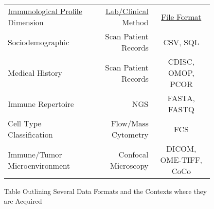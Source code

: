 
\begin{figure*}
\caption{Table Outlining Several Data Formats and the Contexts where they are Acquired}
{\large
\vspace{1.5em}
\begin{tabular}{ l | r | c }
\underline{Immunological Profile Dimension} \hspace{.5em} & \underline{Lab/Clinical Method} \hspace{.5em}   & \underline{File Format} \\
Sociodemographic                & \hspace{.3em} Scan Patient Records \hspace{.3em} & CSV, SQL \\
Medical History                 & \hspace{.3em} Scan Patient Records \hspace{.3em} & CDISC, OMOP, PCOR \\
Immune Repertoire               & \hspace{.3em} NGS \hspace{.3em}                 & FASTA, FASTQ \\
Cell Type Classification        & \hspace{.3em} Flow/Mass Cytometry \hspace{.3em} & FCS \\
Immune/Tumor Microenvironment         & \hspace{.3em} Confocal Microscopy \hspace{.3em} & \hspace{.4em} DICOM, OME-TIFF, CoCo

\end{tabular} 
\vspace{1.5em}
}
\label{fig:tabl}
\end{figure*}



